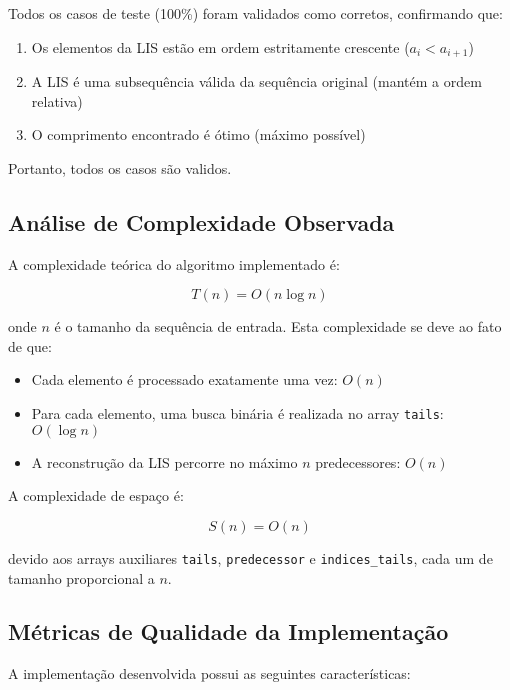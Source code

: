 \documentclass[por]{ajceam-class}
\begin{document}
Todos os casos de teste (100\%) foram validados como corretos, confirmando que:
\begin{enumerate}
    \item Os elementos da LIS estão em ordem estritamente crescente ($a_{i} < a_{i+1}$)
    \item A LIS é uma subsequência válida da sequência original (mantém a ordem relativa)
    \item O comprimento encontrado é ótimo (máximo possível)
\end{enumerate}

Portanto, todos os casos são validos.

\subsection{Análise de Complexidade Observada}

A complexidade teórica do algoritmo implementado é:

\begin{equation}
T(n) = O(n \log n)
\end{equation}

onde $n$ é o tamanho da sequência de entrada. Esta complexidade se deve ao fato de que:

\begin{itemize}
    \item Cada elemento é processado exatamente uma vez: $O(n)$
    \item Para cada elemento, uma busca binária é realizada no array \texttt{tails}: $O(\log n)$
    \item A reconstrução da LIS percorre no máximo $n$ predecessores: $O(n)$
\end{itemize}

A complexidade de espaço é:

\begin{equation}
S(n) = O(n)
\end{equation}

devido aos arrays auxiliares \texttt{tails}, \texttt{predecessor} e \texttt{indices\_tails}, cada um de tamanho proporcional a $n$.

\subsection{Métricas de Qualidade da Implementação}

A implementação desenvolvida possui as seguintes características:
\end{document}
